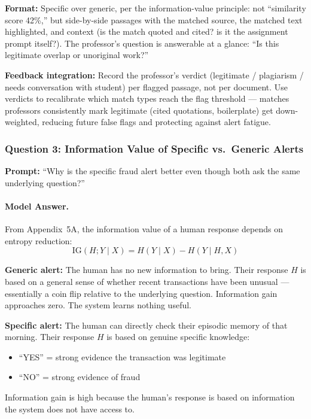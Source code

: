 \textbf{Format:} Specific over generic, per the information-value principle: not ``similarity score 42\%,'' but side-by-side passages with the matched source, the matched text highlighted, and context (is the match quoted and cited? is it the assignment prompt itself?). The professor's question is answerable at a glance: ``Is this legitimate overlap or unoriginal work?''

\textbf{Feedback integration:} Record the professor's verdict (legitimate / plagiarism / needs conversation with student) per flagged passage, not per document. Use verdicts to recalibrate which match types reach the flag threshold --- matches professors consistently mark legitimate (cited quotations, boilerplate) get down-weighted, reducing future false flags and protecting against alert fatigue.

\subsubsection{Question 3: Information Value of Specific vs.\ Generic Alerts}

\textbf{Prompt:} ``Why is the specific fraud alert better even though both ask the same underlying question?''

\paragraph{Model Answer.}

From Appendix~5A, the information value of a human response depends on entropy reduction:
\[
\text{IG}(H; Y \mid X) = H(Y \mid X) - H(Y \mid H, X)
\]

\textbf{Generic alert:} The human has no new information to bring. Their response $H$ is based on a general sense of whether recent transactions have been unusual --- essentially a coin flip relative to the underlying question. Information gain approaches zero. The system learns nothing useful.

\textbf{Specific alert:} The human can directly check their episodic memory of that morning. Their response $H$ is based on genuine specific knowledge:
\begin{itemize}
    \item ``YES'' = strong evidence the transaction was legitimate
    \item ``NO'' = strong evidence of fraud
\end{itemize}
Information gain is high because the human's response is based on information the system does not have access to.

